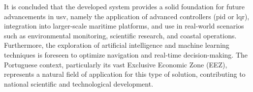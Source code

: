 It is concluded that the developed system provides a solid foundation for future advancements in \acrfull{usv}, namely the application of advanced controllers (\acrfull{pid} or \acrfull{lqr}), integration into larger-scale maritime platforms, and use in real-world scenarios such as environmental monitoring, scientific research, and coastal operations. Furthermore, the exploration of artificial intelligence and machine learning techniques is foreseen to optimize navigation and real-time decision-making. The Portuguese context, particularly its vast Exclusive Economic Zone (EEZ), represents a natural field of application for this type of solution, contributing to national scientific and technological development.


